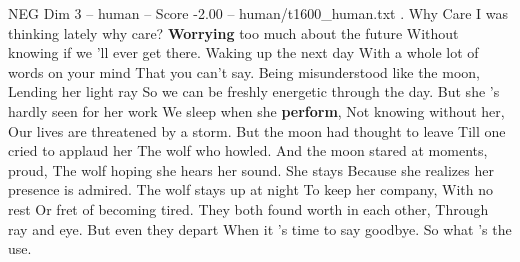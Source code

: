 \begin{textsample}{NEG Dim 3 – human – Score -2.00 – human/t1600\_human.txt}  \label{ex:f3_neg_037}
.
Why Care I was thinking lately why care? \textbf{Worrying} too much about the future Without knowing if we 'll ever get there.
Waking up the next day With a whole lot of words on your mind That you can't say.
Being misunderstood like the moon, Lending her light ray So we can be freshly energetic through the day.
But she 's hardly seen for her work We sleep when she \textbf{perform}, Not knowing without her, Our lives are threatened by a storm.
But the moon had thought to leave Till one cried to applaud her The wolf who howled.
And the moon stared at moments, proud, The wolf hoping she hears her sound.
She stays Because she realizes her presence is admired.
The wolf stays up at night To keep her company, With no rest Or fret of becoming tired.
They both found worth in each other, Through ray and eye.
But even they depart When it ’s time to say goodbye.
So what ’s the use.

\end{textsample}
